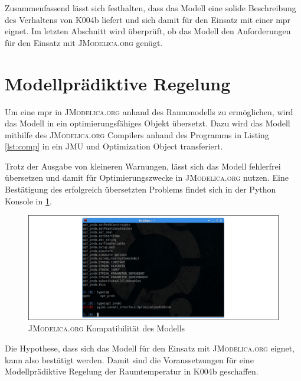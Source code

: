 Zusammenfassend lässt sich festhalten, dass das Modell eine solide Beschreibung des Verhaltens von K004b liefert und sich damit für den Einsatz mit einer \acrlong{mpr} eignet. Im letzten Abschnitt wird überprüft, ob das Modell den Anforderungen für den Einsatz mit \textsc{JModelica.org} genügt.

\newpage

\section{Modellprädiktive Regelung}

Um eine \acrlong{mpr} in \textsc{JModelica.org} anhand des Raummodells zu ermöglichen, wird das Modell in ein optimierungsfähiges Objekt übersetzt. Dazu wird das Modell mithilfe des \textsc{JModelica.org} Compilers anhand des Programms in Listing \ref{lst:comp} in ein JMU und Optimization Object transferiert.



Trotz der Ausgabe von kleineren Warnungen, lässt sich das Modell fehlerfrei übersetzen und damit für Optimierungszwecke in \textsc{JModelica.org} nutzen. Eine Bestätigung des erfolgreich übersetzten Problems findet sich in der Python Konsole in \ref{fig:jmod}.

\begin{figure}
\centering
\includegraphics[width=\textwidth]{abbildungen/20160330_mpc}
\caption{\textsc{JModelica.org} Kompatibilität des Modells}
\label{fig:jmod}
\end{figure}

Die Hypothese, dass sich das Modell für den Einsatz mit \textsc{JModelica.org} eignet, kann also bestätigt werden.
Damit sind die Voraussetzungen für eine Modellprädiktive Regelung der Raumtemperatur in K004b geschaffen.